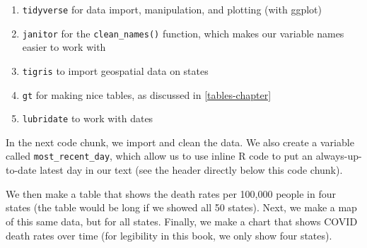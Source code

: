 \documentclass[
]{book}
\providecommand{\tightlist}{%
  \setlength{\itemsep}{0pt}\setlength{\parskip}{0pt}}
\begin{document}
\begin{enumerate}
\def\labelenumi{\arabic{enumi}.}
\tightlist
\item
  \texttt{tidyverse} for data import, manipulation, and plotting (with ggplot)
\item
  \texttt{janitor} for the \texttt{clean\_names()} function, which makes our variable names easier to work with
\item
  \texttt{tigris} to import geospatial data on states
\item
  \texttt{gt} for making nice tables, as discussed in \ref{tables-chapter}
\item
  \texttt{lubridate} to work with dates
\end{enumerate}

In the next code chunk, we import and clean the data. We also create a variable called \texttt{most\_recent\_day}, which allow us to use inline R code to put an always-up-to-date latest day in our text (see the header directly below this code chunk).

We then make a table that shows the death rates per 100,000 people in four states (the table would be long if we showed all 50 states). Next, we make a map of this same data, but for all states. Finally, we make a chart that shows COVID death rates over time (for legibility in this book, we only show four states).
\end{document}
